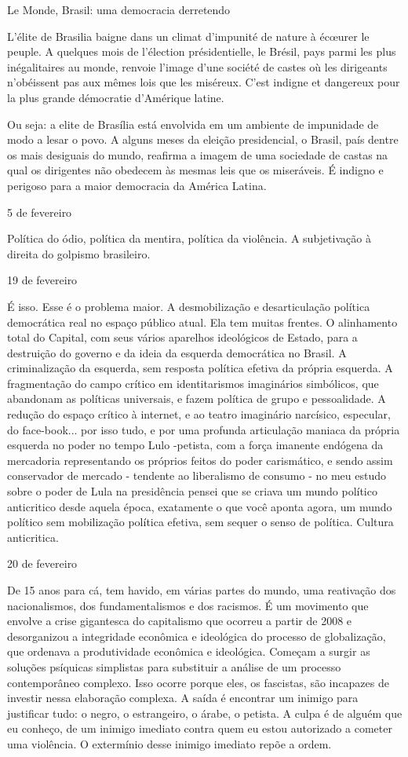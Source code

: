Le Monde, Brasil: uma democracia derretendo

L'élite de Brasilia baigne dans un climat d'impunité de nature à écœurer
le peuple. A quelques mois de l'élection présidentielle, le Brésil, pays
parmi les plus inégalitaires au monde, renvoie l'image d'une société de
castes où les dirigeants n'obéissent pas aux mêmes lois que les
miséreux. C'est indigne et dangereux pour la plus grande démocratie
d'Amérique latine.

Ou seja: a elite de Brasília está envolvida em um ambiente de impunidade
de modo a lesar o povo. A alguns meses da eleição presidencial, o
Brasil, país dentre os mais desiguais do mundo, reafirma a imagem de uma
sociedade de castas na qual os dirigentes não obedecem às mesmas leis
que os miseráveis. É indigno e perigoso para a maior democracia da
América Latina.

5 de fevereiro

Política do ódio, política da mentira, política da violência. A
subjetivação à direita do golpismo brasileiro.

19 de fevereiro

É isso. Esse é o problema maior. A desmobilização e desarticulação
política democrática real no espaço público atual. Ela tem muitas
frentes. O alinhamento total do Capital, com seus vários aparelhos
ideológicos de Estado, para a destruição do governo e da ideia da
esquerda democrática no Brasil. A criminalização da esquerda, sem
resposta política efetiva da própria esquerda. A fragmentação do campo
crítico em identitarismos imaginários simbólicos, que abandonam as
políticas universais, e fazem política de grupo e pessoalidade. A
redução do espaço crítico à internet, e ao teatro imaginário narcísico,
especular, do face-book... por isso tudo, e por uma profunda articulação
maniaca da própria esquerda no poder no tempo Lulo -petista, com a força
imanente endógena da mercadoria representando os próprios feitos do
poder carismático, e sendo assim conservador de mercado - tendente ao
liberalismo de consumo - no meu estudo sobre o poder de Lula na
presidência pensei que se criava um mundo político anticritico desde
aquela época, exatamente o que você aponta agora, um mundo político sem
mobilização política efetiva, sem sequer o senso de política. Cultura
anticritica.

20 de fevereiro

De 15 anos para cá, tem havido, em várias partes do mundo, uma
reativação dos nacionalismos, dos fundamentalismos e dos racismos. É um
movimento que envolve a crise gigantesca do capitalismo que ocorreu a
partir de 2008 e desorganizou a integridade econômica e ideológica do
processo de globalização, que ordenava a produtividade econômica e
ideológica. Começam a surgir as soluções psíquicas simplistas para
substituir a análise de um processo contemporâneo complexo. Isso ocorre
porque eles, os fascistas, são incapazes de investir nessa elaboração
complexa. A saída é encontrar um inimigo para justificar tudo: o negro,
o estrangeiro, o árabe, o petista. A culpa é de alguém que eu conheço,
de um inimigo imediato contra quem eu estou autorizado a cometer uma
violência. O extermínio desse inimigo imediato repõe a ordem.

